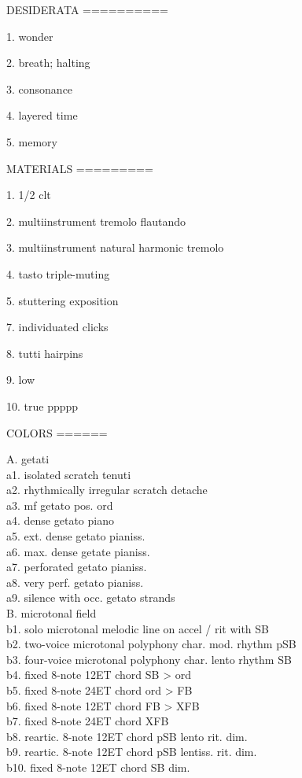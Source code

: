 DESIDERATA
==========

1. wonder

2. breath; halting

3. consonance

4. layered time

5. memory

MATERIALS
=========

1. 1/2 clt

2. multiinstrument tremolo flautando

3. multiinstrument natural harmonic tremolo

4. tasto triple-muting

5. stuttering exposition

7. individuated clicks

8. tutti hairpins

9. low

10. true ppppp

COLORS
======

A. getati\\
\quad  a1. isolated scratch tenuti\\
\quad  a2. rhythmically irregular scratch detache\\
\quad  a3. mf getato pos. ord\\
\quad  a4. dense getato piano\\
\quad  a5. ext. dense getato pianiss.\\
\quad  a6. max. dense getate pianiss.\\
\quad  a7. perforated getato pianiss.\\
\quad  a8. very perf. getato pianiss.\\
\quad  a9. silence with occ. getato strands\\

B. microtonal field\\
\quad  b1. solo microtonal melodic line on accel / rit with SB\\
\quad  b2. two-voice microtonal polyphony char. mod. rhythm pSB\\
\quad  b3. four-voice microtonal polyphony char. lento rhythm SB\\
\quad  b4. fixed 8-note 12ET chord SB > ord\\
\quad  b5. fixed 8-note 24ET chord ord > FB\\
\quad  b6. fixed 8-note 12ET chord FB > XFB\\
\quad  b7. fixed 8-note 24ET chord XFB\\
\quad  b8. reartic. 8-note 12ET chord pSB lento rit. dim.\\
\quad  b9. reartic. 8-note 12ET chord pSB lentiss. rit. dim.\\
\quad  b10. fixed 8-note 12ET chord SB dim.\\

